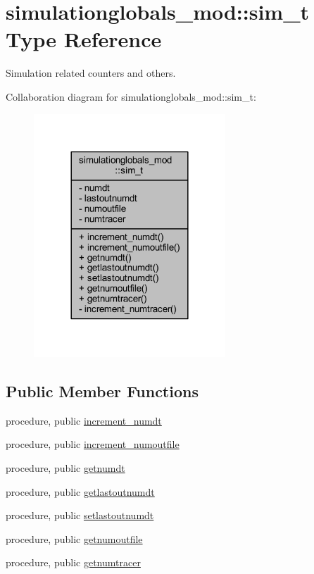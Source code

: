 \hypertarget{structsimulationglobals__mod_1_1sim__t}{}\section{simulationglobals\+\_\+mod\+:\+:sim\+\_\+t Type Reference}
\label{structsimulationglobals__mod_1_1sim__t}


Simulation related counters and others.  




Collaboration diagram for simulationglobals\+\_\+mod\+:\+:sim\+\_\+t\+:\nopagebreak
\begin{figure}[H]
\begin{center}
\leavevmode
\includegraphics[width=204pt]{structsimulationglobals__mod_1_1sim__t__coll__graph}
\end{center}
\end{figure}
\subsection*{Public Member Functions}
\begin{DoxyCompactItemize}
\item 
procedure, public \mbox{\hyperlink{structsimulationglobals__mod_1_1sim__t_ade3d2bcc84ed41592b0712a0355be108}{increment\+\_\+numdt}}
\item 
procedure, public \mbox{\hyperlink{structsimulationglobals__mod_1_1sim__t_af7f7dad94e8a2de058fe88d0d795aac1}{increment\+\_\+numoutfile}}
\item 
procedure, public \mbox{\hyperlink{structsimulationglobals__mod_1_1sim__t_a4f67d96ae861d1600d365cc86acbc1a7}{getnumdt}}
\item 
procedure, public \mbox{\hyperlink{structsimulationglobals__mod_1_1sim__t_a2b15fdf4d29bcfbac38da1b14644ff3f}{getlastoutnumdt}}
\item 
procedure, public \mbox{\hyperlink{structsimulationglobals__mod_1_1sim__t_a4147b0aec912a4a02d56dcffaad2867c}{setlastoutnumdt}}
\item 
procedure, public \mbox{\hyperlink{structsimulationglobals__mod_1_1sim__t_abdb9a18d07e725c9c99423978f014c4c}{getnumoutfile}}
\item 
procedure, public \mbox{\hyperlink{structsimulationglobals__mod_1_1sim__t_af581a3f3854589b767c95bf4b3d3a388}{getnumtracer}}
\end{DoxyCompactItemize}
